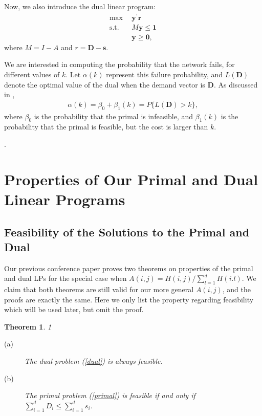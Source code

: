 \documentclass[final,11pt,3p]{article}\usepackage{setspace}
\newtheorem{theorem}{Theorem}
\begin{document}
Now, we also introduce the dual linear program:
\begin{align}
\label{dual}\max~~  & \boldsymbol{y}^{\prime}\boldsymbol{r}\nonumber\\
\text{s.t.}~~  &  M\boldsymbol{y} \le\boldsymbol{1}\nonumber\\
&  \boldsymbol{y} \ge\boldsymbol{0},
\end{align}
where $M = I - A$ and $r = \boldsymbol{D}-\boldsymbol{s}$.

We are interested in computing the probability that the network fails, for different
values of $k$. Let $\alpha(k)$ represent this failure probability, and $L(\boldsymbol{D})$ denote the optimal value of the dual when the demand
vector is $\boldsymbol{D}$. As discussed in \cite{bln},
\begin{align}
\label{alpha}\alpha(k)  = \beta_{0} + \beta_{1}(k) = P\{L(\boldsymbol{D}) > k \},
\end{align}
where $\beta_{0}$ is the
probability that the primal is infeasible, and $\beta_{1}(k)$ is the probability that the primal is feasible, but the cost is larger than $k$. 

{{}}.

\section{ Properties of Our Primal and Dual Linear Programs}

\label{sec:properties}

\subsection{Feasibility of the Solutions to the Primal and Dual}
Our previous conference paper proves two theorems on properties of the primal and dual LPs for the special case when $A(i,j) = H(i,j)/\sum_{l=1}^d H(i.l)$. We claim that both theorems are still valid for our more general $A(i,j)$, and the proofs are exactly the same. Here we only list the property regarding feasibility which will be used later, but omit the proof.

\begin{theorem} {\color{white}1}\label{thm_feasibility} 
\begin{description}

\item[(a)] The dual problem (\ref{dual}) is always feasible.

\item[(b)] The primal problem (\ref{primal}) is feasible if and only if
$\sum_{i=1}^{d} D_{i}\le\sum_{i=1}^{d} s_{i}$.
\end{description}
\end{theorem}
\end{document}
